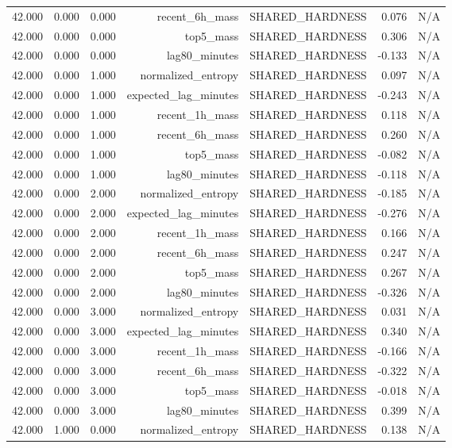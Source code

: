 \begin{table}[h!]
\begin{tabular}{lrrrrrr}
42.000 & 0.000 & 0.000 & recent\_6h\_mass & SHARED\_HARDNESS & 0.076 & N/A \\
42.000 & 0.000 & 0.000 & top5\_mass & SHARED\_HARDNESS & 0.306 & N/A \\
42.000 & 0.000 & 0.000 & lag80\_minutes & SHARED\_HARDNESS & -0.133 & N/A \\
42.000 & 0.000 & 1.000 & normalized\_entropy & SHARED\_HARDNESS & 0.097 & N/A \\
42.000 & 0.000 & 1.000 & expected\_lag\_minutes & SHARED\_HARDNESS & -0.243 & N/A \\
42.000 & 0.000 & 1.000 & recent\_1h\_mass & SHARED\_HARDNESS & 0.118 & N/A \\
42.000 & 0.000 & 1.000 & recent\_6h\_mass & SHARED\_HARDNESS & 0.260 & N/A \\
42.000 & 0.000 & 1.000 & top5\_mass & SHARED\_HARDNESS & -0.082 & N/A \\
42.000 & 0.000 & 1.000 & lag80\_minutes & SHARED\_HARDNESS & -0.118 & N/A \\
42.000 & 0.000 & 2.000 & normalized\_entropy & SHARED\_HARDNESS & -0.185 & N/A \\
42.000 & 0.000 & 2.000 & expected\_lag\_minutes & SHARED\_HARDNESS & -0.276 & N/A \\
42.000 & 0.000 & 2.000 & recent\_1h\_mass & SHARED\_HARDNESS & 0.166 & N/A \\
42.000 & 0.000 & 2.000 & recent\_6h\_mass & SHARED\_HARDNESS & 0.247 & N/A \\
42.000 & 0.000 & 2.000 & top5\_mass & SHARED\_HARDNESS & 0.267 & N/A \\
42.000 & 0.000 & 2.000 & lag80\_minutes & SHARED\_HARDNESS & -0.326 & N/A \\
42.000 & 0.000 & 3.000 & normalized\_entropy & SHARED\_HARDNESS & 0.031 & N/A \\
42.000 & 0.000 & 3.000 & expected\_lag\_minutes & SHARED\_HARDNESS & 0.340 & N/A \\
42.000 & 0.000 & 3.000 & recent\_1h\_mass & SHARED\_HARDNESS & -0.166 & N/A \\
42.000 & 0.000 & 3.000 & recent\_6h\_mass & SHARED\_HARDNESS & -0.322 & N/A \\
42.000 & 0.000 & 3.000 & top5\_mass & SHARED\_HARDNESS & -0.018 & N/A \\
42.000 & 0.000 & 3.000 & lag80\_minutes & SHARED\_HARDNESS & 0.399 & N/A \\
42.000 & 1.000 & 0.000 & normalized\_entropy & SHARED\_HARDNESS & 0.138 & N/A \\

\end{tabular}
\end{table}
